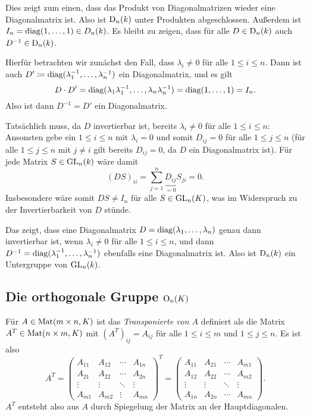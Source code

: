 Dies zeigt zum einen, dass das Produkt von Diagonalmatrizen wieder eine Diagonalmatrix ist. Also ist $\mathrm{D}_n(k)$ unter Produkten abgeschlossen. Außerdem ist $I_n = \mathrm{diag}(1, \dotsc, 1) \in D_n(k)$. Es bleibt zu zeigen, dass für alle $D \in \mathrm{D}_n(k)$ auch $D^{-1} \in \mathrm{D}_n(k)$.

Hierfür betrachten wir zunächst den Fall, dass $\lambda_i \neq 0$ für alle $1 \leq i \leq n$. Dann ist auch $D' \coloneqq \mathrm{diag}(\lambda_1^{-1}, \dotsc, \lambda_n^{-1})$ ein Diagonalmatrix, und es gilt
\[
 D \cdot D'
 = \mathrm{diag}(\lambda_1 \lambda_1^{-1}, \dotsc, \lambda_n \lambda_n^{-1})
 = \mathrm{diag}(1, \dotsc, 1)
 = I_n.
\]
Also ist dann $D^{-1} = D'$ ein Diagonalmatrix.

Tatsächlich muss, da $D$ invertierbar ist, bereits $\lambda_i \neq 0$ für alle $1 \leq i \leq n$: Ansonsten gebe ein $1 \leq i \leq n$ mit $\lambda_i = 0$ und somit $D_{ij} = 0$ für alle $1 \leq j \leq n$ (für alle $1 \leq j \leq n$ mit $j \neq i$ gilt bereits $D_{ij} = 0$, da $D$ ein Diagonalmatrix ist). Für jede Matrix $S \in \mathrm{GL}_n(k)$ wäre damit
\[
 (DS)_{ii}
 = \sum_{j=1}^n \underbrace{D_{ij}}_{=0} S_{ji}
 = 0.
\]
Insbesondere wäre somit $DS \neq I_n$ für alle $S \in \mathrm{GL}_n(K)$, was im Widerspruch zu der Invertierbarkeit von $D$ stünde.

Das zeigt, dass eine Diagonalmatrix $D = \mathrm{diag}(\lambda_1, \dotsc, \lambda_n)$ genau dann invertierbar ist, wenn $\lambda_i \neq 0$ für alle $1 \leq i \leq n$, und dann $D^{-1} = \mathrm{diag}(\lambda_1^{-1}, \dotsc, \lambda_n^{-1})$ ebenfalls eine Diagonalmatrix ist. Also ist $\mathrm{D}_n(k)$ ein Untergruppe von $\mathrm{GL}_n(k)$.





\subsection{Die orthogonale Gruppe \texorpdfstring{$\mathrm{O}_n(K)$}{On(K)}}

\begin{defi}
 Für $A \in \mathrm{Mat}(m \times n, K)$ ist das \emph{Transponierte von $A$} definiert als die Matrix $A^T \in \mathrm{Mat}(n \times m, K)$ mit $(A^T)_{ij} = A_{ij}$ für alle $1 \leq i \leq m$ und $1 \leq j \leq n$. Es ist also
 \[
  A^T
  =
  \begin{pmatrix}
   A_{11} & A_{12} & \cdots & A_{1n} \\
   A_{21} & A_{22} & \cdots & A_{2n} \\
   \vdots & \vdots & \ddots & \vdots \\
   A_{m1} & A_{m2} & \vdots & A_{mn}
  \end{pmatrix}^T
  =
  \begin{pmatrix}
   A_{11} & A_{21} & \cdots & A_{m1} \\
   A_{12} & A_{22} & \cdots & A_{m2} \\
   \vdots & \vdots & \ddots & \vdots \\
   A_{1n} & A_{2n} & \cdots & A_{mn}
  \end{pmatrix}.
 \]
 $A^T$ entsteht also aus $A$ durch Spiegelung der Matrix an der Hauptdiagonalen.
\end{defi}

